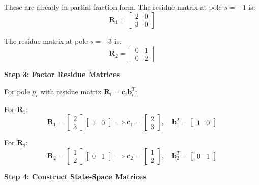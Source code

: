 These are already in partial fraction form. The residue matrix at pole $s = -1$ is:
\begin{equation}
\mathbf{R}_1 = \begin{bmatrix} 2 & 0 \\ 3 & 0 \end{bmatrix}
\end{equation}

The residue matrix at pole $s = -3$ is:
\begin{equation}
\mathbf{R}_2 = \begin{bmatrix} 0 & 1 \\ 0 & 2 \end{bmatrix}
\end{equation}

\textbf{Step 3: Factor Residue Matrices}

For pole $p_i$ with residue matrix $\mathbf{R}_i = \mathbf{c}_i\mathbf{b}_i^T$:

For $\mathbf{R}_1$:
\begin{equation}
\mathbf{R}_1 = \begin{bmatrix} 2 \\ 3 \end{bmatrix} \begin{bmatrix} 1 & 0 \end{bmatrix} \implies \mathbf{c}_1 = \begin{bmatrix} 2 \\ 3 \end{bmatrix}, \quad \mathbf{b}_1^T = \begin{bmatrix} 1 & 0 \end{bmatrix}
\end{equation}

For $\mathbf{R}_2$:
\begin{equation}
\mathbf{R}_2 = \begin{bmatrix} 1 \\ 2 \end{bmatrix} \begin{bmatrix} 0 & 1 \end{bmatrix} \implies \mathbf{c}_2 = \begin{bmatrix} 1 \\ 2 \end{bmatrix}, \quad \mathbf{b}_2^T = \begin{bmatrix} 0 & 1 \end{bmatrix}
\end{equation}

\textbf{Step 4: Construct State-Space Matrices}

